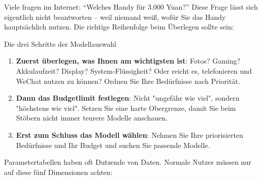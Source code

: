 


Viele fragen im Internet: “Welches Handy für 3.000 Yuan?” Diese Frage lässt sich eigentlich nicht beantworten – weil niemand weiß, wofür Sie das Handy hauptsächlich nutzen. Die richtige Reihenfolge beim Überlegen sollte sein:

\begin{tcbinfo}{Die drei Schritte der Modellauswahl}
\begin{enumerate}
  \item \textbf{Zuerst überlegen, was Ihnen am wichtigsten ist}: Fotos? Gaming? Akkulaufzeit? Display? System-Flüssigkeit? Oder reicht es, telefonieren und WeChat nutzen zu können? Ordnen Sie Ihre Bedürfnisse nach Priorität.
  \item \textbf{Dann das Budgetlimit festlegen}: Nicht "ungefähr wie viel", sondern "höchstens wie viel". Setzen Sie eine harte Obergrenze, damit Sie beim Stöbern nicht immer teurere Modelle anschauen.
  \item \textbf{Erst zum Schluss das Modell wählen}: Nehmen Sie Ihre priorisierten Bedürfnisse und Ihr Budget und suchen Sie passende Modelle.
\end{enumerate}

\end{tcbinfo}


Parametertabellen haben oft Dutzende von Daten. Normale Nutzer müssen nur auf diese fünf Dimensionen achten:

